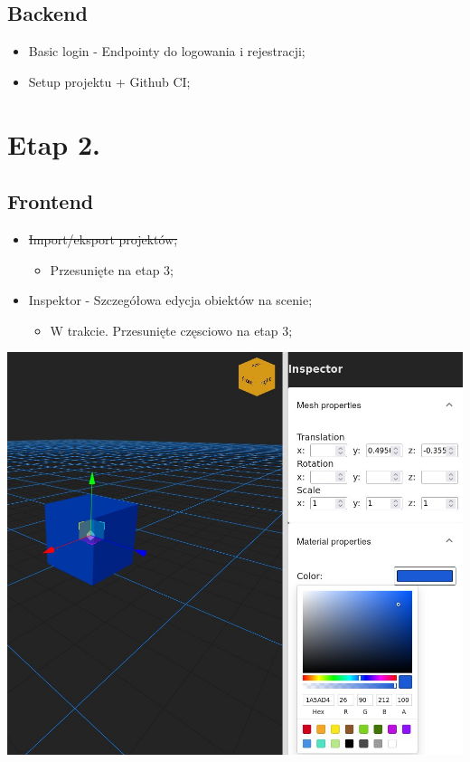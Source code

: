 \documentclass[11pt]{article}
\begin{document}
\subsection{Backend}
\label{sec:org7937ab6}
\begin{itemize}
\item Basic login - Endpointy do logowania i rejestracji;
\item Setup projektu + Github CI;
\end{itemize}
\section{Etap 2.}
\label{sec:orgee974e9}
\subsection{Frontend}
\label{sec:orgeac0f21}
\begin{itemize}
\item \sout{Import/eksport projektów;}
\begin{itemize}
\item Przesunięte na etap 3;
\end{itemize}
\item Inspektor - Szczegółowa edycja obiektów na scenie;
\begin{itemize}
\item W trakcie. Przesunięte częsciowo na etap 3;
\end{itemize}
\end{itemize}
\begin{center}
\includegraphics[width=.9\linewidth]{./img/inspector-demo.jpg}
\end{center}
\end{document}

